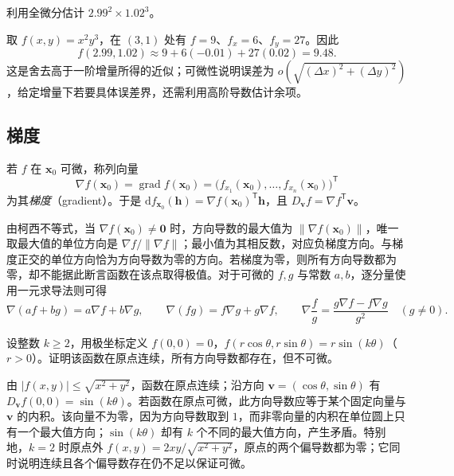 \begin{example}
\label{ex:total-differential-approximation-ch14}
利用全微分估计 $2.99^2\times1.02^3$。
\end{example}
\begin{solve}
取 $f(x,y)=x^2y^3$，在 $(3,1)$ 处有 $f=9$、$f_x=6$、$f_y=27$。因此
\[
    f(2.99,1.02)\approx9+6(-0.01)+27(0.02)=9.48.
\]
这是舍去高于一阶增量所得的近似；可微性说明误差为 $o(\sqrt{(\Delta x)^2+(\Delta y)^2})$，给定增量下若要具体误差界，还需利用高阶导数估计余项。
\end{solve}

\subsection{梯度}
\label{subsec:gradient}

\begin{definition}
\label{def:gradient-ch14}
若 $f$ 在 $\boldsymbol x_0$ 可微，称列向量
\[
    \nabla f(\boldsymbol x_0)
    =\operatorname{grad}f(\boldsymbol x_0)
    =\bigl(f_{x_1}(\boldsymbol x_0),\ldots,f_{x_n}(\boldsymbol x_0)\bigr)^{\mathsf T}
\]
为其\emph{梯度}（gradient）。于是 $\mathrm df_{\boldsymbol x_0}(\boldsymbol h)=\nabla f(\boldsymbol x_0)^{\mathsf T}\boldsymbol h$，且 $D_{\boldsymbol v}f=\nabla f^{\mathsf T}\boldsymbol v$。
\end{definition}

由柯西不等式，当 $\nabla f(\boldsymbol x_0)\ne\boldsymbol0$ 时，方向导数的最大值为 $\|\nabla f(\boldsymbol x_0)\|$，唯一取最大值的单位方向是 $\nabla f/\|\nabla f\|$；最小值为其相反数，对应负梯度方向。与梯度正交的单位方向恰为方向导数为零的方向。若梯度为零，则所有方向导数都为零，却不能据此断言函数在该点取得极值。对于可微的 $f,g$ 与常数 $a,b$，逐分量使用一元求导法则可得
\[
    \nabla(af+bg)=a\nabla f+b\nabla g,\qquad
    \nabla(fg)=f\nabla g+g\nabla f,\qquad
    \nabla\frac fg=\frac{g\nabla f-f\nabla g}{g^2}\quad(g\ne0).
\]

\begin{example}
\label{ex:continuous-all-directional-not-differentiable-ch14}
设整数 $k\geq2$，用极坐标定义 $f(0,0)=0$，$f(r\cos\theta,r\sin\theta)=r\sin(k\theta)$（$r>0$）。证明该函数在原点连续，所有方向导数都存在，但不可微。
\end{example}
\begin{solve}
由 $|f(x,y)|\leq\sqrt{x^2+y^2}$，函数在原点连续；沿方向 $\boldsymbol v=(\cos\theta,\sin\theta)$ 有 $D_{\boldsymbol v}f(0,0)=\sin(k\theta)$。若函数在原点可微，此方向导数应等于某个固定向量与 $\boldsymbol v$ 的内积。该向量不为零，因为方向导数取到 $1$，而非零向量的内积在单位圆上只有一个最大值方向；$\sin(k\theta)$ 却有 $k$ 个不同的最大值方向，产生矛盾。特别地，$k=2$ 时原点外 $f(x,y)=2xy/\sqrt{x^2+y^2}$，原点的两个偏导数都为零；它同时说明连续且各个偏导数存在仍不足以保证可微。
\end{solve}

